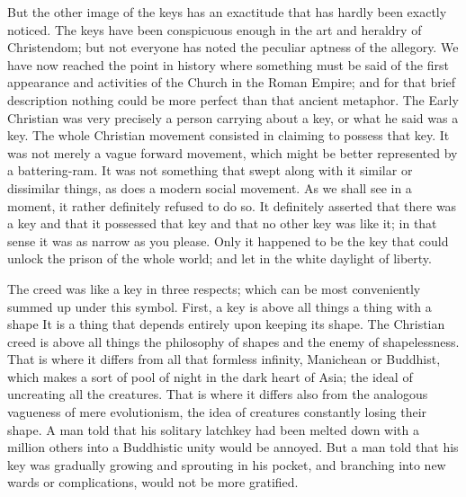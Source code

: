 But the other image of the keys has an exactitude that has hardly been exactly noticed. The keys have been conspicuous enough in the art and heraldry of Christendom; but not everyone has noted the peculiar aptness of the allegory. We have now reached the point in history where something must be said of the first appearance and activities of the Church in the Roman Empire; and for that brief description nothing could be more perfect than that ancient metaphor. The Early Christian was very precisely a person carrying about a key, or what he said was a key. The whole Christian movement consisted in claiming to possess that key. It was not merely a vague forward movement, which might be better represented by a battering-ram. It was not something that swept along with it similar or dissimilar things, as does a modern social movement. As we shall see in a moment, it rather definitely refused to do so. It definitely asserted that there was a key and that it possessed that key and that no other key was like it; in that sense it was as narrow as you please. Only it happened to be the key that could unlock the prison of the whole world; and let in the white daylight of liberty.

The creed was like a key in three respects; which can be most conveniently summed up under this symbol. First, a key is above all things a thing with a shape It is a thing that depends entirely upon keeping its shape. The Christian creed is above all things the philosophy of shapes and the enemy of shapelessness. That is where it differs from all that formless infinity, Manichean or Buddhist, which makes a sort of pool of night in the dark heart of Asia; the ideal of uncreating all the creatures. That is where it differs also from the analogous vagueness of mere evolutionism, the idea of creatures constantly losing their shape. A man told that his solitary latchkey had been melted down with a million others into a Buddhistic unity would be annoyed. But a man told that his key was gradually growing and sprouting in his pocket, and branching into new wards or complications, would not be more gratified.

